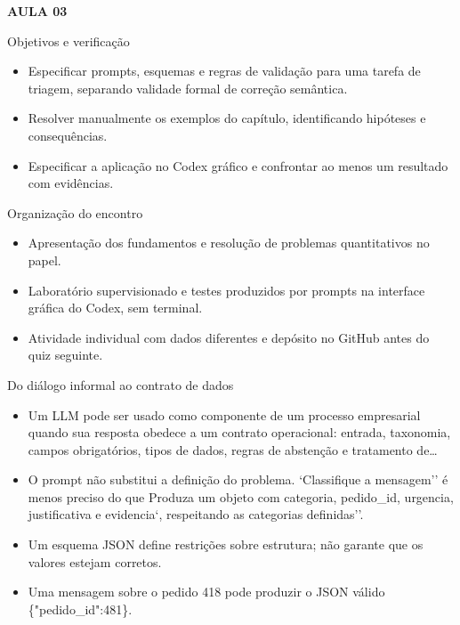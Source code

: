 \documentclass[10pt,aspectratio=169]{beamer}
\begin{document}
\begin{frame}[t]{}
\vspace{14mm}\textcolor{InsperRed}{\bfseries AULA 03}\par\vspace{4mm}{\LARGE\bfseries Engenharia de prompts e saídas estruturadas}\par\vspace{6mm}{\large Operações empresariais}\par{}
\end{frame}

\begin{frame}[t]{Objetivos e verificação}
\small
\begin{itemize}
\item Especificar prompts, esquemas e regras de validação para uma tarefa de triagem, separando validade formal de correção semântica.
\item Resolver manualmente os exemplos do capítulo, identificando hipóteses e consequências.
\item Especificar a aplicação no Codex gráfico e confrontar ao menos um resultado com evidências.
\end{itemize}
\end{frame}

\begin{frame}[t]{Organização do encontro}
\small
\begin{itemize}
\item Apresentação dos fundamentos e resolução de problemas quantitativos no papel.
\item Laboratório supervisionado e testes produzidos por prompts na interface gráfica do Codex, sem terminal.
\item Atividade individual com dados diferentes e depósito no GitHub antes do quiz seguinte.
\end{itemize}
\end{frame}

\begin{frame}[t]{Do diálogo informal ao contrato de dados}
\small
\begin{itemize}
\item Um LLM pode ser usado como componente de um processo empresarial quando sua resposta obedece a um contrato operacional: entrada, taxonomia, campos obrigatórios, tipos de dados, regras de abstenção e tratamento de…
\item O prompt não substitui a definição do problema. `Classifique a mensagem'' é menos preciso do que Produza um objeto com categoria, pedido\_id, urgencia, justificativa e evidencia`, respeitando as categorias definidas''.
\item Um esquema JSON define restrições sobre estrutura; não garante que os valores estejam corretos.
\item Uma mensagem sobre o pedido 418 pode produzir o JSON válido \{"pedido\_id":481\}.
\end{itemize}
\end{frame}
\end{document}
